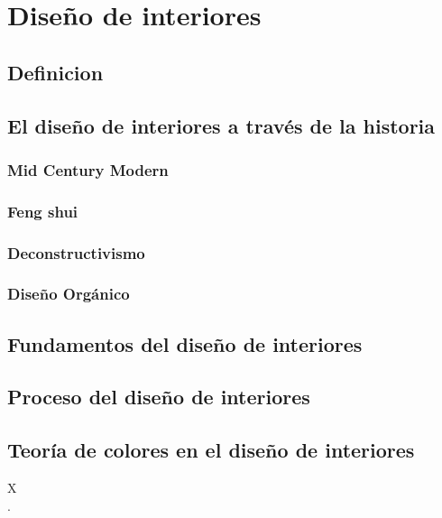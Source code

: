 \section{Diseño de interiores}
\subsection{Definicion}

\subsection{El diseño de interiores a través de la historia}

\subsubsection{Mid Century Modern}
\subsubsection{Feng shui}
\subsubsection{Deconstructivismo}
\subsubsection{Diseño Orgánico}

\subsection{Fundamentos del diseño de interiores}

\subsection{Proceso del diseño de interiores}

\subsection{Teoría de colores en el diseño de interiores}
X\\.\par 
